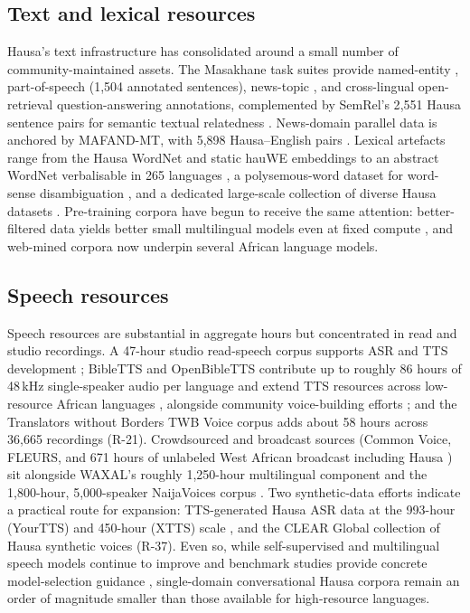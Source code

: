 \documentclass[sn-basic,pdflatex]{sn-jnl}
\begin{document}
\subsection{Text and lexical resources}
Hausa's text infrastructure has consolidated around a small number of community-maintained assets. The Masakhane task suites provide named-entity \citep{p051,p112}, part-of-speech \citep{p055} (1{,}504 annotated sentences), news-topic \citep{p109}, and cross-lingual open-retrieval question-answering \citep{p113} annotations, complemented by SemRel's 2{,}551 Hausa sentence pairs for semantic textual relatedness \citep{p061}. News-domain parallel data is anchored by MAFAND-MT, with 5{,}898 Hausa--English pairs \citep{p027}. Lexical artefacts range from the Hausa WordNet \citep{p086} and static hauWE embeddings \citep{p021} to an abstract WordNet verbalisable in 265 languages \citep{p022}, a polysemous-word dataset for word-sense disambiguation \citep{p085}, and a dedicated large-scale collection of diverse Hausa datasets \citep{p083}. Pre-training corpora have begun to receive the same attention: better-filtered data yields better small multilingual models even at fixed compute \citep{p084}, and web-mined corpora now underpin several African language models.

\subsection{Speech resources}
Speech resources are substantial in aggregate hours but concentrated in read and studio recordings. A 47-hour studio read-speech corpus supports ASR and TTS development \citep{p038}; BibleTTS and OpenBibleTTS contribute up to roughly 86 hours of 48\,kHz single-speaker audio per language and extend TTS resources across low-resource African languages \citep{p039,p045}, alongside community voice-building efforts \citep{p126}; and the Translators without Borders TWB Voice corpus adds about 58 hours across 36{,}665 recordings (R-21). Crowdsourced and broadcast sources (Common Voice, FLEURS, and 671 hours of unlabeled West African broadcast including Hausa \citep{p040}) sit alongside WAXAL's roughly 1{,}250-hour multilingual component \citep{p046} and the 1{,}800-hour, 5{,}000-speaker NaijaVoices corpus \citep{p127}. Two synthetic-data efforts indicate a practical route for expansion: TTS-generated Hausa ASR data at the 993-hour (YourTTS) and 450-hour (XTTS) scale \citep{p041}, and the CLEAR Global collection of Hausa synthetic voices (R-37). Even so, while self-supervised and multilingual speech models continue to improve \citep{p125,p131} and benchmark studies provide concrete model-selection guidance \citep{p044,p128}, single-domain conversational Hausa corpora remain an order of magnitude smaller than those available for high-resource languages.
\end{document}
